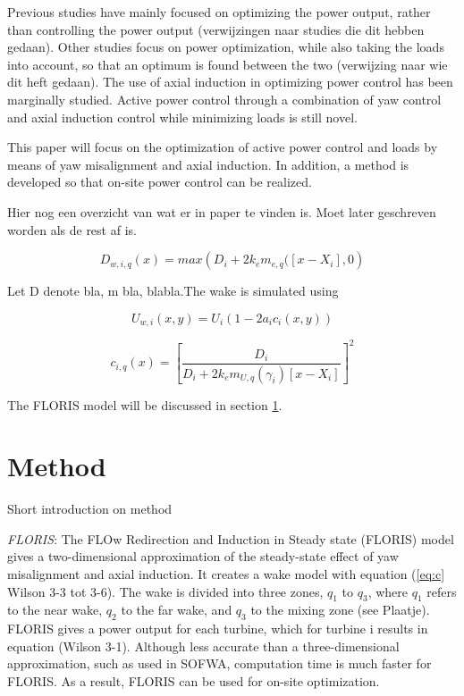 \documentclass[twoside,twocolumn]{article}
\begin{document}
Previous studies have mainly focused on optimizing the power output, rather than controlling the power output (verwijzingen naar studies die dit hebben gedaan).  Other studies focus on power optimization, while also taking the loads into account, so that an optimum is found between the two (verwijzing naar wie dit heft gedaan). The use of axial induction in optimizing power control has been marginally studied. Active power control through a combination of yaw control and axial induction control while minimizing loads is still novel.

This paper will focus on the optimization of active power control and loads by means of yaw misalignment and axial induction. In addition, a method is developed so that on-site power control can be realized.

Hier nog een overzicht van wat er in paper te vinden is. Moet later geschreven worden als de rest af is.
	
\begin{equation}
\label{eq:Dw}
D_{w,i,q}(x) = max\left( {D_i + 2k_em_{e,q}([x - X_i],0} \right)
\end{equation}

Let D denote bla, m bla, blabla.The wake is simulated using

\begin{equation}
\label{eq:Uw}
U_{w,i}(x,y) = U_i\left( {1-2a_ic_i(x,y)} \right)
\end{equation}

\begin{equation}
\label{eq:c}
c_{i,q}(x) = \left[ \frac{D_i}{D_i + 2k_em_{U,q}(\gamma_i)[x - X_i]} \right]^2
\end{equation}


The FLORIS model will be discussed in section \ref{sec:method}.
	
	
	\section{Method}
\label{sec:method}
	
	Short introduction on method 

	\textit{FLORIS}: The FLOw Redirection and Induction in Steady state (FLORIS) model gives a two-dimensional approximation of the steady-state effect of yaw misalignment and axial induction. It creates a wake model with equation (\ref{eq:c}  Wilson 3-3 tot 3-6). The wake is divided into three zones, $q_1$ to $q_3$, where $q_1$ refers to the near wake, $q_2$ to the far wake, and $q_3$ to the mixing zone (see Plaatje). FLORIS gives a power output for each turbine, which for turbine i results in equation (Wilson 3-1). Although less accurate than a three-dimensional approximation, such as used in SOFWA, computation time is much faster for FLORIS. As a result, FLORIS can be used for on-site optimization. 
\end{document}
